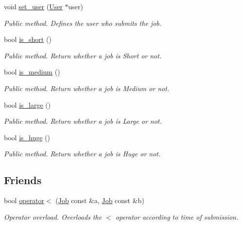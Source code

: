 \begin{DoxyCompactItemize}
void \hyperlink{classJob_ace0d1b35fda43268e8a80cf846a59b02}{set\+\_\+user} (\hyperlink{classUser}{User} $\ast$user)
\begin{DoxyCompactList}\small\item\em Public method. Defines the user who submits the job. \end{DoxyCompactList}\item 
bool \hyperlink{classJob_af82ed715e92ab934401cd31af3582fbd}{is\+\_\+short} ()
\begin{DoxyCompactList}\small\item\em Public method. Return whether a job is Short or not. \end{DoxyCompactList}\item 
bool \hyperlink{classJob_a544bd796241d22eb4a2b96d2086f705a}{is\+\_\+medium} ()
\begin{DoxyCompactList}\small\item\em Public method. Return whether a job is Medium or not. \end{DoxyCompactList}\item 
bool \hyperlink{classJob_a7ce2c1d04f42a48f379d43080361fbc8}{is\+\_\+large} ()
\begin{DoxyCompactList}\small\item\em Public method. Return whether a job is Large or not. \end{DoxyCompactList}\item 
bool \hyperlink{classJob_ac34a235386a111274a5f55e2534c323b}{is\+\_\+huge} ()
\begin{DoxyCompactList}\small\item\em Public method. Return whether a job is Huge or not. \end{DoxyCompactList}\end{DoxyCompactItemize}
\subsection*{Friends}
\begin{DoxyCompactItemize}
\item 
bool \hyperlink{classJob_a7cd0c5ec425cbac29dc2d35c316736a8}{operator$<$} (\hyperlink{classJob}{Job} const \&a, \hyperlink{classJob}{Job} const \&b)
\begin{DoxyCompactList}\small\item\em Operator overload. Overloads the $<$ operator according to time of submission. \end{DoxyCompactList}\end{DoxyCompactItemize}


